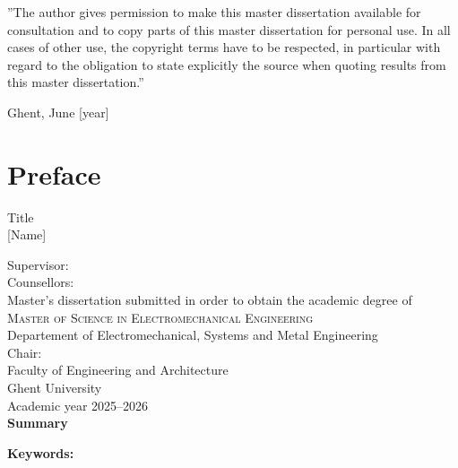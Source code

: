 \documentclass[11pt,a4paper]{report}
\newcommand{\npar}{\vspace{0.5cm} \par \noindent}
\begin{document}

\newpage
\vspace*{\fill}
\noindent
''The author gives permission to make this master dissertation available for consultation and to copy parts of this master dissertation for personal use. In all cases of other use, the copyright terms have to be respected, in particular with regard to the obligation to state explicitly the source when quoting results from this master dissertation.''

\addvspace{2cm}

\noindent Ghent, June [year]\\
\noindent [Name]

\newpage
{}
\section*{Preface}
\npar
\noindent
[Preface]


\newpage
{}
{
\setlength{\baselineskip}{12pt}
\setlength{\parindent}{0pt}
\setlength{\parskip}{6pt}



\renewcommand{\baselinestretch}{1.1}
\noindent {}
\fontsize{14pt}{21pt}
\selectfont
\vspace{-2.5cm}
\begin{center}
Title\\
\renewcommand{\baselinestretch}{1.3}
\fontsize{12pt}{14pt}
\selectfont
\vspace{0.5cm}
[Name]\\
\end{center}

\renewcommand{\baselinestretch}{1.3}
\fontsize{12pt}{12pt}
\selectfont

Supervisor: \\
Counsellors: \\

Master's dissertation submitted in order to obtain the academic degree of\\
\textsc{Master of Science in Electromechanical Engineering}\\

Departement of Electromechanical, Systems and Metal Engineering\\
Chair: \\
Faculty of Engineering and Architecture\\
Ghent University\\
Academic year 2025--2026\\

\textbf{Summary}



\textbf{Keywords:} 
}
\end{document}
